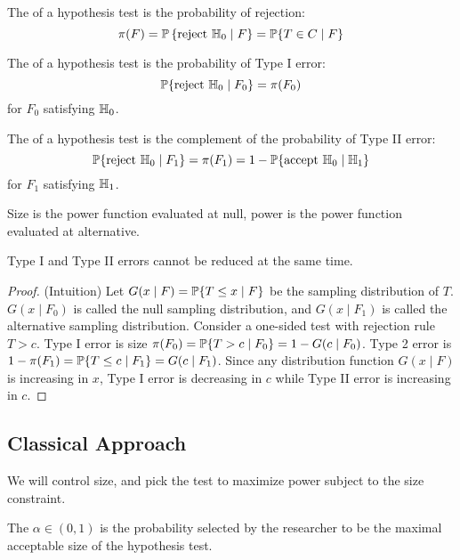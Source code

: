 \documentclass[10pt]{article}
\begin{document}
\begin{definition}
	The  of a hypothesis test is the probability of rejection:
	\[
	\pi(F) = \mathbb{P}\left\{ \text{reject } \mathbb{H}_0 \mid F\right\} = \mathbb{P}\{T \in C \mid F\}
	\]
\end{definition}

\begin{definition}
	The  of a hypothesis test is the probability of Type I error:
	\[
	\mathbb{P}\{\text{reject } \mathbb{H}_0 \mid F_0 \} = \pi(F_0)
	\]
	for $F_0$ satisfying $\mathbb{H}_0$.
\end{definition}

\begin{definition}
	The  of a hypothesis test is the complement of the probability of Type II error:
	\[
	\mathbb{P}\{\text{reject } \mathbb{H}_0 \mid F_1\} = \pi(F_1) = 1 - \mathbb{P}\{\text{accept } \mathbb{H}_0 \mid \mathbb{H}_1\}
	\]
	for $F_1$ satisfying $\mathbb{H}_1$.
\end{definition}

\begin{remark}
	Size is the power function evaluated at null, power is the power function evaluated at alternative.
\end{remark}

\begin{theorem}
	Type I and Type II errors cannot be reduced at the same time.
\end{theorem}
\begin{proof}
	(Intuition) Let $G(x \mid F) = \mathbb{P}\{T \le x \mid F\}$ be the sampling distribution of $T$. $G(x \mid F_0)$ is called the null sampling distribution, and $G(x \mid F_1)$ is called the alternative sampling distribution. Consider a one-sided test with rejection rule $T > c$. Type I error is size $\pi(F_0) = \mathbb{P}\{T > c \mid F_0\} = 1 - G(c \mid F_0)$. Type 2 error is $1 - \pi(F_1) = \mathbb{P}\{T \le c \mid F_1\} = G(c \mid F_1)$. Since any distribution function $G(x\mid F)$ is increasing in $x$, Type I error is decreasing in $c$ while Type II error is increasing in $c$.
\end{proof}

\subsection{Classical Approach}

We will control size, and pick the test to maximize power subject to the size constraint.

\begin{definition}
	The  $\alpha \in (0,1)$ is the probability selected by the researcher to be the maximal acceptable size of the hypothesis test.
\end{definition}
\end{document}
